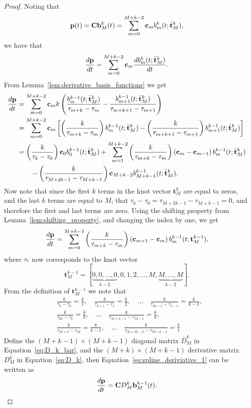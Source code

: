 \begin{proof}
Noting that
\[
\mathbf{p}(t) = \mathbf{C} \mathbf{b}_M^k(t)
              = \sum_{m=0}^{M+k-2} \mathbf{c}_m b_m^k(t; \bar{\mathbf{t}}_M^k),
\]
we have that
\[
\frac{d\mathbf{p}}{dt} = \sum_{m=0}^{M+k-2} \mathbf{c}_m \frac{d b_m^k(t; \bar{\mathbf{t}}_M^k)}{dt}.
\]
From Lemma~\ref{lem:derivative_basis_functions} we get
\begin{align*}
\frac{d\mathbf{p}}{dt} &= \sum_{m=0}^{M+k-2} \mathbf{c}_m k\left(\frac{b_m^{k-1}(t; \bar{\mathbf{t}}_M^k)}{\tau_{m+k}-\tau_m} - \frac{b_{m+1}^{k-1}(t; \bar{\mathbf{t}}_M^k)}{\tau_{m+k+1}-\tau_{m+1}} \right) \\
&= \sum_{m=0}^{M+k-2} \mathbf{c}_m \left[ \left(\frac{k}{\tau_{m+k}-\tau_m}\right) b_m^{k-1}(t; \bar{\mathbf{t}}_M^k) - \left(\frac{k}{\tau_{m+k+1}-\tau_{m+1}}\right)  b_{m+1}^{k-1}(t; \bar{\mathbf{t}}_M^k) \right] \\
&= \left(\frac{k}{\tau_{k}-\tau_0}\right)\mathbf{c}_0 b_0^{k-1}(t; \bar{\mathbf{t}}_M^k) + \sum_{m=1}^{M+k-2} \left(\frac{k}{\tau_{m+k}-\tau_m}\right) \left(  \mathbf{c}_m - \mathbf{c}_{m-1}  \right) b_m^{k-1}(t; \bar{\mathbf{t}}_M^k) \\
&\qquad - \left(\frac{k}{\tau_{M+2k-1}-\tau_{M+k-1}}\right)\mathbf{c}_{M+k-2}b_{M+k-1}^{k-1}(t; \bar{\mathbf{t}}_M^k).
\end{align*}
Now note that since the first $k$ terms in the knot vector $\mathbf{t}_M^k$ are equal to zeros, and the last $k$ terms are equal to $M$, that $\tau_k-\tau_0 = \tau_{M+2k-1}-\tau_{M+k-1} = 0$, and therefore the first and last terms are zero.  Using the shifting property from Lemma~\ref{lem:shifting_property}, and changing the index by one, we get
\begin{equation}\label{eq:spline_deriviative_1}
\frac{d\mathbf{p}}{dt} = \sum_{m=0}^{M+k-3} \left(\frac{k}{\tau_{m+k}-\tau_{m}}\right) \left( \cbf_{m+1} - \cbf_{m}  \right) b_{m}^{k-1}(t; \mathbf{t}_M^{k-1}),
\end{equation}
where $\tau_\ast$ now corresponds to the knot vector 
\[
\mathbf{t}_M^{k-1} = [\underbrace{0, 0, \dots, 0}_{k-2}, 0, 1, 2, \dots, M, \underbrace{M, \dots, M}_{k-2}].
\]
From the definition of $\mathbf{t}_M^{k-1}$ we note that
\begin{align*}
& \frac{k}{\tau_{k}-\tau_0} = \frac{k}{1}, \quad
\frac{k}{\tau_{k+1}-\tau_1} = \frac{k}{2}, \quad
\dots \quad
\frac{k}{\tau_{2k-1}-\tau_{k-1}} = \frac{k}{k-1},  \\
&\frac{k}{\tau_{2k}-\tau_{k}} = \frac{k}{k}, \quad
\dots \quad
\frac{k}{\tau_{M+k-1} - \tau_{M-1}} = \frac{k}{k}, \\
& \frac{k}{\tau_{M+k} - \tau_{M}} = \frac{k}{k-1}, \quad
\dots \quad
\frac{k}{\tau_{M+2k-2} - \tau_{M+k-2}} = \frac{k}{1}
\end{align*}
Define the $(M+k-1)\times(M+k-1)$ diagonal matrix $\bar{D}_M^k$ in Equation~\eqref{eq:D_k_bar}, and the $(M+k)\times (M+k-1)$ derivative matrix $D_M^k$ in Equation~\eqref{eq:D_k},
then Equation~\eqref{eq:spline_deriviative_1} can be written as
\[
\frac{d\mathbf{p}}{dt} = \mathbf{C} D_M^k \mathbf{b}_M^{k-1}(t).
\]
\end{proof}

